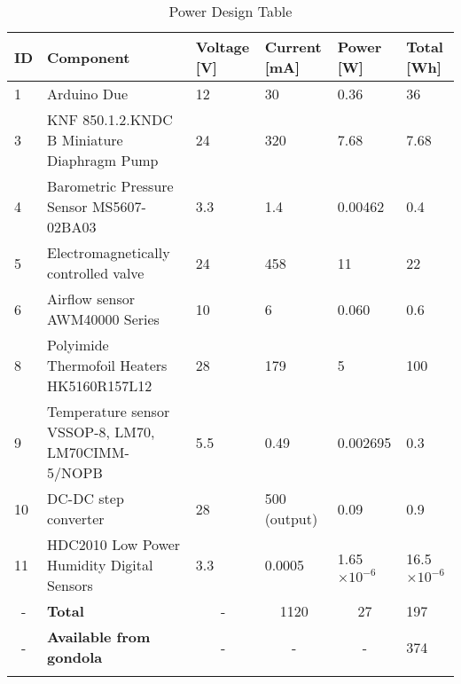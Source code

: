 \begin{longtable}{|m{}| m{} |m{} |m{}|m{}| m{} |}
\hline
\textbf{ID}             & \textbf{Component}                                                   & \textbf{Voltage {[}V{]}} & \textbf{Current {[}mA{]}} & \textbf{Power {[}W{]}} & \textbf{Total {[}Wh{]}} \\ \hline
1 & Arduino Due & 12& 30  & 0.36  & 36  \\ \hline
3 & KNF   850.1.2.KNDC   B Miniature Diaphragm Pump & 24 & 320 & 7.68 & 7.68 \\ \hline
4  & Barometric Pressure Sensor MS5607-02BA03 & 3.3 & 1.4 & 0.00462 & 0.4  \\ \hline
5  & Electromagnetically controlled valve & 24 & 458 & 11  & 22 \\ \hline
6 & Airflow sensor AWM40000 Series  & 10  & 6   & 0.060 & 0.6 \\ \hline

8   & Polyimide Thermofoil Heaters HK5160R157L12  & 28 & 179  & 5 & 100 \\ \hline
9  & Temperature sensor VSSOP-8, LM70, LM70CIMM-5/NOPB & 5.5 & 0.49 & 0.002695  & 0.3   \\ \hline
10  & DC-DC step converter   & 28   & 500 (output) & 0.09 & 0.9 \\ \hline
11 & HDC2010 Low Power Humidity Digital Sensors & 3.3  & 0.0005   & 1.65$\times10^{-6}$  & 16.5$\times10^{-6}$ \\ \hline
\multicolumn{1}{|c|}{-} & \textbf{Total}                                  & \multicolumn{1}{c|}{-}                      & \multicolumn{1}{c|}{1120}                    & \multicolumn{1}{c|}{27}                 & 197                                        \\ \hline
\multicolumn{1}{|c|}{-} & \textbf{Available from gondola}                 & \multicolumn{1}{c|}{-}                      & \multicolumn{1}{c|}{-}                       & \multicolumn{1}{c|}{-}                    & 374                                        \\ \hline

\caption{Power Design Table}
\label{tab:power-design-table}
\end{longtable}
\raggedbottom

